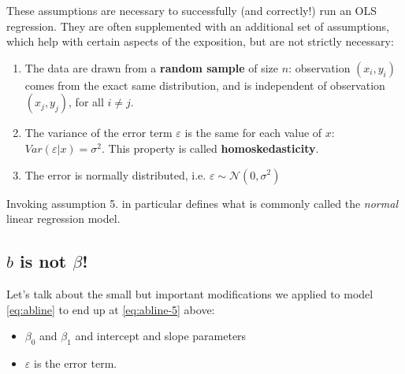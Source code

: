 \documentclass[]{book}
\providecommand{\tightlist}{%
  \setlength{\itemsep}{0pt}\setlength{\parskip}{0pt}}
\begin{document}
These assumptions are necessary to successfully (and correctly!) run an OLS regression. They are often supplemented with an additional set of assumptions, which help with certain aspects of the exposition, but are not strictly necessary:

\begin{enumerate}
\def\labelenumi{\arabic{enumi}.}
\setcounter{enumi}{2}
\tightlist
\item
  The data are drawn from a \textbf{random sample} of size \(n\): observation \((x_i,y_i)\) comes from the exact same distribution, and is independent of observation \((x_j,y_j)\), for all \(i\neq j\).
\item
  The variance of the error term \(\varepsilon\) is the same for each value of \(x\): \(Var(\varepsilon|x) = \sigma^2\). This property is called \textbf{homoskedasticity}.
\item
  The error is normally distributed, i.e. \(\varepsilon \sim \mathcal{N}(0,\sigma^2)\)
\end{enumerate}

Invoking assumption 5. in particular defines what is commonly called the \emph{normal} linear regression model.

\hypertarget{b-is-not-beta}{%
\subsection{\texorpdfstring{\(b\) is not \(\beta\)!}{b is not \textbackslash{}beta!}}\label{b-is-not-beta}}

Let's talk about the small but important modifications we applied to model \eqref{eq:abline} to end up at \eqref{eq:abline-5} above:

\begin{itemize}
\tightlist
\item
  \(\beta_0\) and \(\beta_1\) and intercept and slope parameters
\item
  \(\varepsilon\) is the error term.
\end{itemize}
\end{document}
